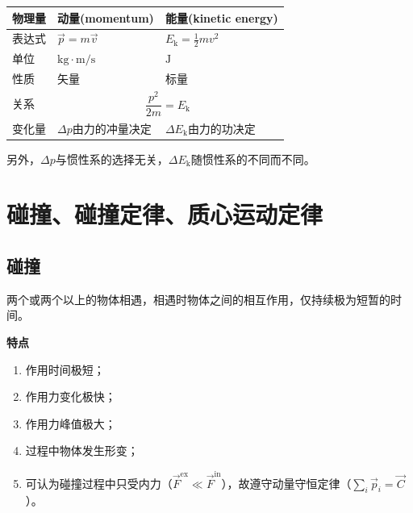 \documentclass[
	12pt, %
	a4paper, %
]{myLegrandOrangeBook}
\begin{document}
    \begin{table}[htbp]
        \centering
        \begin{tabular}{|l|ll|}
            \hline
            \textbf{物理量} & \multicolumn{1}{l|}{\textbf{动量(momentum)}}                    & \textbf{能量(kinetic energy)}      \\ \hline
            表达式          & \multicolumn{1}{l|}{\(\overrightarrow{p} = m\overrightarrow{v}\)} & \(E_{\mathrm{k}} = \frac{1}{2}mv^2\) \\ \hline
            单位  & \multicolumn{1}{l|}{\(\mathrm{kg \cdot m / s}\)} & \(\mathrm{J}\)                  \\ \hline
            性质  & \multicolumn{1}{l|}{矢量}                      & 标量                          \\ \hline
            关系  & \multicolumn{2}{c|}{\(\dfrac{p^2}{2m} = E_{\mathrm{k}}\)}                       \\ \hline
            变化量 & \multicolumn{1}{l|}{\(\Delta p\)由力的冲量决定}         & \(\Delta E_{\mathrm{k}}\)由力的功决定 \\ \hline
        \end{tabular}
    \end{table}

    另外，\(\Delta p\)与惯性系的选择无关，\(\Delta E_{\mathrm{k}}\)随惯性系的不同而不同。

    \section{碰撞、碰撞定律、质心运动定律}

    \subsection{碰撞}

    \begin{definition}[碰撞]

        两个或两个以上的物体相遇，相遇时物体之间的相互作用，仅持续极为短暂的时间。

    \end{definition}

    \textbf{特点}

    \begin{enumerate}
        \item 作用时间极短；
        \item 作用力变化极快；
        \item 作用力峰值极大；
        \item 过程中物体发生形变；
        \item 可认为碰撞过程中只受内力（\(\overrightarrow{F}^{\mathrm{ex}} \ll \overrightarrow{F}^{\mathrm{in}}\)），故遵守动量守恒定律（\(\sum_{i} \overrightarrow{p}_{i} = \overrightarrow{C}\)）。
    \end{enumerate}
\end{document}
